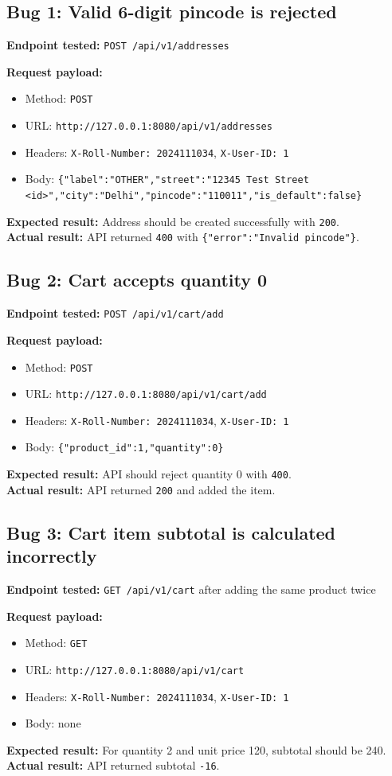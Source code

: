 \documentclass[12pt]{article}
\begin{document}
\subsection{Bug 1: Valid 6-digit pincode is rejected}
\textbf{Endpoint tested:} \texttt{POST /api/v1/addresses}

\textbf{Request payload:}
\begin{itemize}
    \item Method: \texttt{POST}
    \item URL: \texttt{http://127.0.0.1:8080/api/v1/addresses}
    \item Headers: \texttt{X-Roll-Number: 2024111034}, \texttt{X-User-ID: 1}
    \item Body: \texttt{\{"label":"OTHER","street":"12345 Test Street <id>","city":"Delhi","pincode":"110011","is\_default":false\}}
\end{itemize}
\textbf{Expected result:} Address should be created successfully with \texttt{200}.\\
\textbf{Actual result:} API returned \texttt{400} with \texttt{\{"error":"Invalid pincode"\}}.

\subsection{Bug 2: Cart accepts quantity 0}
\textbf{Endpoint tested:} \texttt{POST /api/v1/cart/add}

\textbf{Request payload:}
\begin{itemize}
    \item Method: \texttt{POST}
    \item URL: \texttt{http://127.0.0.1:8080/api/v1/cart/add}
    \item Headers: \texttt{X-Roll-Number: 2024111034}, \texttt{X-User-ID: 1}
    \item Body: \texttt{\{"product\_id":1,"quantity":0\}}
\end{itemize}
\textbf{Expected result:} API should reject quantity 0 with \texttt{400}.\\
\textbf{Actual result:} API returned \texttt{200} and added the item.

\subsection{Bug 3: Cart item subtotal is calculated incorrectly}
\textbf{Endpoint tested:} \texttt{GET /api/v1/cart} after adding the same product twice

\textbf{Request payload:}
\begin{itemize}
    \item Method: \texttt{GET}
    \item URL: \texttt{http://127.0.0.1:8080/api/v1/cart}
    \item Headers: \texttt{X-Roll-Number: 2024111034}, \texttt{X-User-ID: 1}
    \item Body: none
\end{itemize}
\textbf{Expected result:} For quantity 2 and unit price 120, subtotal should be 240.\\
\textbf{Actual result:} API returned subtotal \texttt{-16}.
\end{document}

